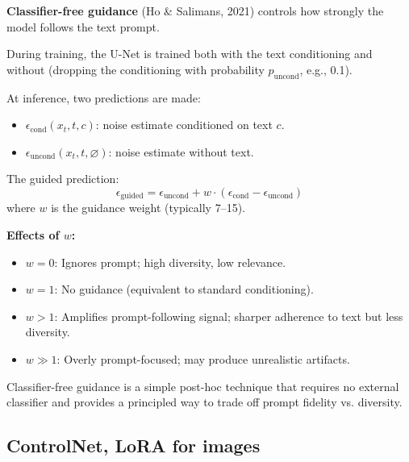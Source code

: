 \begin{paperbox}[title={Classifier-Free Guidance}]
\textbf{Classifier-free guidance} (Ho \& Salimans, 2021) controls how strongly the model follows the text prompt.

During training, the U-Net is trained both with the text conditioning and without (dropping the conditioning with probability $p_\text{uncond}$, e.g., 0.1).

At inference, two predictions are made:
\begin{itemize}
  \item $\epsilon_\text{cond}(x_t, t, c)$: noise estimate conditioned on text $c$.
  \item $\epsilon_\text{uncond}(x_t, t, \varnothing)$: noise estimate without text.
\end{itemize}
The guided prediction:
\[
\epsilon_\text{guided} = \epsilon_\text{uncond} + w \cdot (\epsilon_\text{cond} - \epsilon_\text{uncond})
\]
where $w$ is the guidance weight (typically 7--15).

\textbf{Effects of $w$:}
\begin{itemize}
  \item $w = 0$: Ignores prompt; high diversity, low relevance.
  \item $w = 1$: No guidance (equivalent to standard conditioning).
  \item $w > 1$: Amplifies prompt-following signal; sharper adherence to text but less diversity.
  \item $w \gg 1$: Overly prompt-focused; may produce unrealistic artifacts.
\end{itemize}

\begin{notebox}
Classifier-free guidance is a simple post-hoc technique that requires no external classifier and provides a principled way to trade off prompt fidelity vs. diversity.
\end{notebox}
\end{paperbox}


\subsection{ControlNet, LoRA for images}

